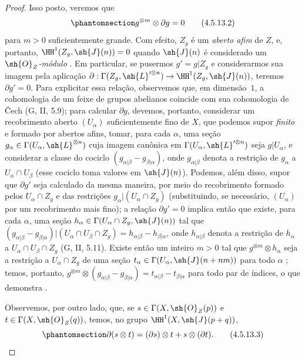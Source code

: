 \documentclass[oneside,10pt]{amsart}
\makeatletter
\newcommand{\ega@arrow}[2]{\mathchoice{#1}{#2}{#2}{#2}}
\renewcommand{\to}{\ega@arrow{\longrightarrow}{\rightarrow}}
\let\EGAOriginalLabel\label
\renewcommand{\label}[1]{\phantomsection\EGAOriginalLabel{#1}}
\makeatother
\begin{document}
\begin{proof}
  Isso posto, veremos que
  \[
  \label{II.4.5.13.2}
    g^{\otimes m}\otimes\partial g=0
  \tag{4.5.13.2}
  \]
  para $m>0$ suficientemente grande.
  Com efeito, $Z_g$ é um \emph{aberto afim} de $Z$, e, portanto, $\HH^1(Z_g,\sh{J}(n))=0$ quando $\sh{J}(n)$ é considerado um \emph{$\sh{O}_Z$-módulo} .
  Em particular, se pusermos $g'=g|Z_g$ e considerarmos sua imagem pela aplicação $\partial:\Gamma(Z_g,\sh{L}'^{\otimes n})\to\HH^1(Z_g,\sh{J}(n))$, teremos $\partial g'=0$.
  Para explicitar essa relação, observemos que, em dimensão~$1$, a cohomologia de um feixe de grupos abelianos coincide com sua cohomologia de \v{C}ech (G, II, 5.9);
  para calcular $\partial g$, devemos, portanto, considerar um recobrimento aberto $(U_\alpha)$ suficientemente fino de $X$, que podemos supor \emph{finito} e formado por abertos afins, tomar, para cada $\alpha$, uma seção $g_\alpha\in\Gamma(U_\alpha,\sh{L}^{\otimes n})$ cuja imagem canônica em $\Gamma(U_\alpha,\sh{L}'^{\otimes n})$ seja $g|U_\alpha$, e considerar a classe do cociclo $(g_{\alpha|\beta}-g_{\beta|\alpha})$, onde $g_{\alpha|\beta}$ denota a restrição de $g_\alpha$ a $U_\alpha\cap U_\beta$ (esse cociclo toma valores em $\sh{J}(n)$).
  Podemos, além disso, supor que $\partial g'$ seja calculado da mesma maneira, por meio do recobrimento formado pelos $U_\alpha\cap Z_g$ e das restrições $g_\alpha|(U_\alpha\cap Z_g)$ (substituindo, se necessário, $(U_\alpha)$ por um recobrimento mais fino);
  a relação $\partial g'=0$ implica então que existe, para cada $\alpha$, uma seção $h_\alpha\in\Gamma(U_\alpha\cap Z_g,\sh{J}(n))$ tal que $(g_{\alpha|\beta}-g_{\beta|\alpha})|(U_\alpha\cap U_\beta\cap Z_g)=h_{\alpha|\beta}-h_{\beta|\alpha}$, onde $h_{\alpha|\beta}$ denota a restrição de $h_\alpha$ a $U_\alpha\cap U_\beta\cap Z_g$ (G, II, 5.11).
  Existe então um inteiro $m>0$ tal que $g^{\otimes m}\otimes h_\alpha$ seja a restrição a $U_\alpha\cap Z_g$ de uma seção $t_\alpha\in\Gamma(U_\alpha,\sh{J}(n+nm))$ para todo $\alpha$ ;
  temos, portanto, $g^{\otimes m}\otimes(g_{\alpha|\beta}-g_{\beta|\alpha})=t_{\alpha|\beta}-t_{\beta|\alpha}$ para todo par de índices, o que demonstra .

  Observemos, por outro lado, que, se $s\in\Gamma(X,\sh{O}_Z(p))$ e $t\in\Gamma(X,\sh{O}_Z(q))$, temos, no grupo $\HH^1(X,\sh{J}(p+q))$,
  \[
  \label{II.4.5.13.3}
    \partial(s\otimes t)=(\partial s)\otimes t+s\otimes(\partial t).
  \tag{4.5.13.3}
  \]


\end{proof}
\end{document}
